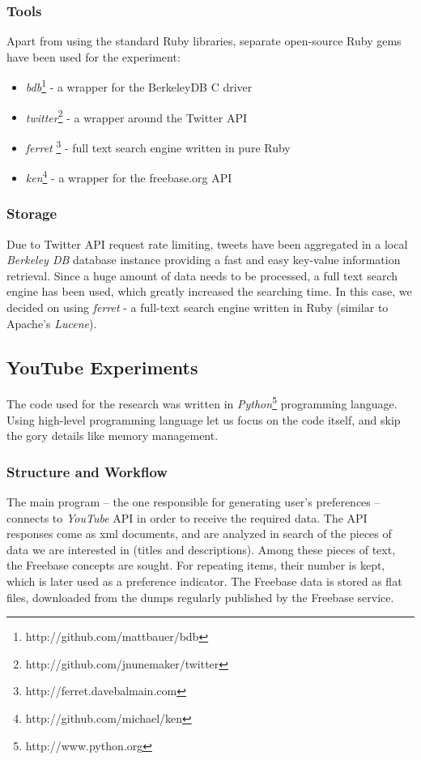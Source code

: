 \subsubsection{Tools}
Apart from using the standard Ruby libraries, separate open-source Ruby gems have been used for the experiment:
\begin{itemize}
  \item \textit{bdb}\footnote{http://github.com/mattbauer/bdb} - a wrapper for the BerkeleyDB C driver
  \item \textit{twitter}\footnote{http://github.com/jnunemaker/twitter} - a wrapper around the Twitter API
  \item \textit{ferret} \footnote{http://ferret.davebalmain.com} - full text search engine written in pure Ruby
  \item \textit{ken}\footnote{http://github.com/michael/ken} - a wrapper for the freebase.org API
\end{itemize}

\subsubsection{Storage}
Due to Twitter API request rate limiting, tweets have been aggregated in a local
\textit{Berkeley DB} database instance providing a fast and easy key-value
information retrieval. Since a huge amount of data needs to be processed, a full
text search engine has been used, which greatly increased the searching time. In
this case, we decided on using \textit{ferret} - a full-text search engine
written in Ruby (similar to Apache's \textit{Lucene}).

\subsection{YouTube Experiments}
The code used for the research was written in \textit{Python}\footnote{http://www.python.org}
programming language. Using high-level programming language let us focus on the code itself, and skip the
gory details like memory management.

\subsubsection{Structure and Workflow}
The main program -- the one responsible for generating user's preferences
-- connects to \textit{YouTube} API in order to receive the required data. The
API responses come as xml documents, and are analyzed in search of the pieces of
data we are interested in (titles and descriptions). Among these pieces of text,
the Freebase concepts are sought. For repeating items, their number is kept,
which is later used as a preference indicator.  The Freebase data
is stored as flat files, downloaded from the dumps regularly published by the
Freebase service.

